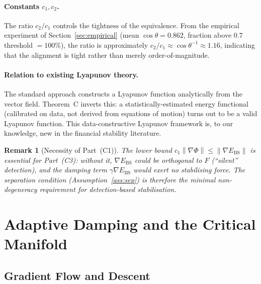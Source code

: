 \documentclass[11pt]{article}
\newtheorem{remark}[theorem]{Remark}
\theoremstyle{definition}
\newcommand{\grad}{\nabla}
\newcommand{\Ebs}{E_{\mathrm{BS}}}
\newcommand{\norm}[1]{\left\|#1\right\|}
\newcommand{\costheta}{\cos\theta}
\begin{document}
\paragraph{Constants $c_1, c_2$.}
The ratio $c_2/c_1$ controls the tightness of the equivalence.  From the empirical
experiment of Section~\ref{sec:empirical} (mean $\costheta = 0.862$,
fraction above $0.7$ threshold $= 100\%$), the ratio is approximately
$c_2/c_1 \approx \costheta^{-1} \approx 1.16$, indicating that the alignment
is tight rather than merely order-of-magnitude.

\paragraph{Relation to existing Lyapunov theory.}
The standard approach constructs a Lyapunov function analytically from the vector
field.  Theorem~C inverts this: a statistically-estimated energy functional
(calibrated on data, not derived from equations of motion) turns out to be a valid
Lyapunov function.  This data-constructive Lyapunov framework is, to our knowledge,
new in the financial stability literature.

\begin{remark}[Necessity of Part~(C1)]
\label{rem:C1_necessity}
The lower bound $c_1\norm{\grad\Phi} \le \norm{\grad\Ebs}$ is essential for
Part~(C3): without it, $\grad\Ebs$ could be orthogonal to $F$ (``silent''
detection), and the damping term $\gamma\grad\Ebs$ would exert no stabilising
force.  The separation condition (Assumption~\ref{ass:sep}) is therefore the
minimal non-degeneracy requirement for detection-based stabilisation.
\end{remark}

\section{Adaptive Damping and the Critical Manifold}
\label{sec:damping}


\subsection{Gradient Flow and Descent}
\end{document}

